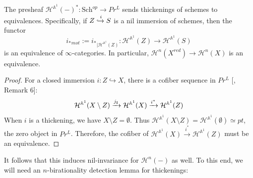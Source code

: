 \begin{thm}\label{motivic deformation invariant}
 The presheaf $\mathcal{H}^{\mathbb{A}^1}(-)^*: \mathrm{Sch}^{op}\to Pr^L$ sends thickenings of schemes to equivalences. Specifically, if $Z\xhookrightarrow{i} S$ is a nil immersion of schemes, then the functor $${i_*}_{mot}:={i_*}_{|\mathcal{H}^{\mathbb{A}^1}(Z)}:  \mathcal{H}^{\mathbb{A}^1}(Z) \to \mathcal{H}^{\mathbb{A}^1}(S)$$ is an equivalence of $\infty$-categories. In particular, $\mathcal{H}^{n}(X^{red})\to \mathcal{H}^{n}(X)$ is an equivalence.
    \end{thm}
\begin{proof}
For a closed immersion $i:Z\hookrightarrow X$, there is a cofiber sequence in $Pr^L$ [\cite{hoyois2021localization}, Remark 6]:
$$ \mathcal{H}^{\mathbb{A}^1}(X\setminus Z)\xrightarrow{j_{\mathord{\text{\tiny $\sharp$}}}}\mathcal{H}^{\mathbb{A}^1}(X)\xrightarrow{i^*}\mathcal{H}^{\mathbb{A}^1}(Z)$$
When $i$ is a thickening, we have $X\setminus Z=\emptyset$. Thus $\mathcal{H}^{\mathbb{A}^1}(X\setminus Z)=\mathcal{H}^{\mathbb{A}^1}(\emptyset)\simeq pt$, the zero object in $Pr^L$. Therefore, the cofiber of $\mathcal{H}^{\mathbb{A}^1}(X)\xrightarrow{i^*}\mathcal{H}^{\mathbb{A}^1}(Z)$ must be an equivalence.
\end{proof}
It follows that this induces nil-invariance for $\mathcal{H}^n(-)$ as well. To this end, we will need an $n$-birationality detection lemma for thickenings:
